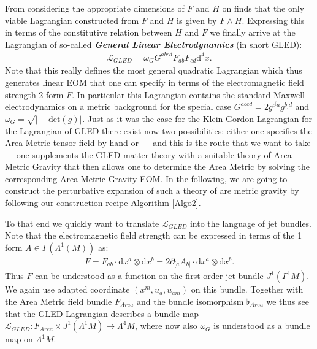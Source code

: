 \documentclass[a4paper,12pt, DIV=14, BCOR=5mm, twoside, headsepline, numbers=noenddot]{scrbook}
\begin{document}
From considering the appropriate dimensions of $F$ and $H$ on finds that the only viable Lagrangian constructed from $F$ and $H$ is given by $F \wedge H$. Expressing this in terms of the constitutive relation between $H$ and $F$ we finally arrive at the Lagrangian of so-called \textbf{\textit{General Linear Electrodynamics}} (in short GLED):
\begin{align}
    \mathcal{L}_{GLED} = \omega_G G^{abcd}F_{ab}F_{cd}\mathrm{d}^4x.
\end{align}
Note that this really defines the most general quadratic Lagrangian which thus generates linear EOM that one can specify in terms of the electromagnetic field strength 2 form $F$. In particular this Lagrangian contains the standard Maxwell electrodynamics on a metric background for the special case $G^{abcd} = 2 g^{c^[a}g^{b]d}$ and $\omega_{G}=\sqrt{\vert -\mathrm{det}(g) \vert}$. Just as it was the case for the Klein-Gordon Lagrangian for the Lagrangian of GLED there exist now two possibilities: either one specifies the Area Metric tensor field by hand or --- and this is the route that we want to take --- one supplements the GLED matter theory with a suitable theory of Area Metric Gravity that then allows one to determine the Area Metric by solving the corresponding Area Metric Gravity EOM. 
In the following, we are going to construct the perturbative expansion of such a theory of are metric gravity by following our construction recipe Algorithm \ref{Algo2}.

To that end we quickly want to translate $\mathcal{L}_{GLED}$ into the language of jet bundles. Note that the electromagnetic field strength can be expressed in terms of the 1 form $A \in \Gamma(\Lambda^1(M))$ as:
\begin{align}
F = F_{ab} \cdot  \mathrm{d}x^a \otimes \mathrm{d}x^b = 2 \partial_{[a} A_{b]} \cdot \mathrm{d}x^a \otimes \mathrm{d}x^b.
\end{align}
Thus $F$ can be understood as a function on the first order jet bundle $J^1(\Gamma^1M)$. We again use adapted coordinate $(x^m,u_a,u_{am})$ on this bundle. Together with the Area Metric field bundle $F_{Area}$ and the bundle isomorphism $\flat_{Area}$ we thus see that the GLED Lagrangian describes a bundle map $\mathcal{L}_{GLED} : F_{Area} \times J^1(\Lambda^1M) \rightarrow \Lambda^4M $, where now also $\omega_G$ is understood as a bundle map on $\Lambda^1M$.  
\end{document}
